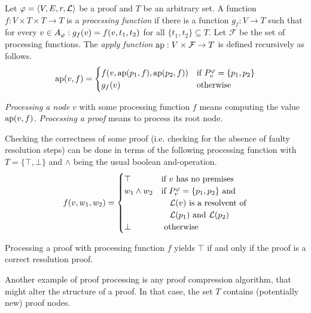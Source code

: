 \begin{definition}
\label{def:proof-processing}

Let $\varphi = \langle V,E,r,\mathcal{L} \rangle$ be a proof and $T$ be an arbitrary set.
A function $f: V \times T \times T \rightarrow T$ is a \emph{processing function} if there is a function $g_f: V \rightarrow T$ such that for every $v \in A_{\varphi}: g_f(v) = f(v,t_1,t_2)$ for all $\{t_1,t_2\} \subseteq T$.
Let $\mathcal{F}$ be the set of processing functions.
The \emph{apply function} $\operatorname{ap}: V \times \mathcal{F} \rightarrow T$ is defined recursively as follows.
$$
\operatorname{ap}(v,f) = 
\begin{cases}
	f(v,\operatorname{ap}(p_1,f),\operatorname{ap}(p_2,f)) &\text{if } P_{v}^{\varphi} = \{p_1,p_2\} \\
	g_f(v) &\text{otherwise}\\
\end{cases}
$$

\emph{Processing a node} $v$ with some processing function $f$ means computing the value $\operatorname{ap}(v,f)$.
\emph{Processing a proof} means to process its root node.

\end{definition}

\begin{example}

Checking the correctness of some proof (i.e. checking for the absence of faulty resolution steps) can be done in terms of the following processing function with $T = \{\top,\bot\}$ and $\wedge$ being the usual boolean and-operation.
$$
f(v,w_1,w_2) = 
\begin{cases}
	\top & \text{if } v \text{ has no premises} \\
	w_1 \wedge w_2 &\text{if } P_{v}^{\varphi} = \{p_1,p_2\} \text{ and}\\
								 &\quad \mathcal{L}(v) \text{ is a resolvent of} \\
								 &\quad \mathcal{L}(p_1) \text{ and } \mathcal{L}(p_2)\\
	\bot & \text{ otherwise}
\end{cases}
$$

Processing a proof with processing function $f$ yields $\top$ if and only if the proof is a correct resolution proof.
\end{example}

Another example of proof processing is any proof compression algorithm, that might alter the structure of a proof.
In that case, the set $T$ contains (potentially new) proof nodes.